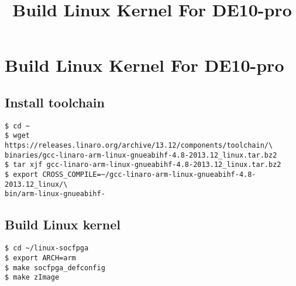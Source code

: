 \documentclass{article}
\title{Build Linux Kernel For DE10-pro}
\begin{document}
\maketitle

\section{Build Linux Kernel For DE10-pro}
\subsection{Install toolchain}
\begin{lstlisting}
$ cd ~
$ wget https://releases.linaro.org/archive/13.12/components/toolchain/\
binaries/gcc-linaro-arm-linux-gnueabihf-4.8-2013.12_linux.tar.bz2
$ tar xjf gcc-linaro-arm-linux-gnueabihf-4.8-2013.12_linux.tar.bz2
$ export CROSS_COMPILE=~/gcc-linaro-arm-linux-gnueabihf-4.8-2013.12_linux/\
bin/arm-linux-gnueabihf-
\end{lstlisting}

\subsection{Build Linux kernel}
\begin{lstlisting}
$ cd ~/linux-socfpga
$ export ARCH=arm
$ make socfpga_defconfig
$ make zImage
\end{lstlisting}
\end{document}
